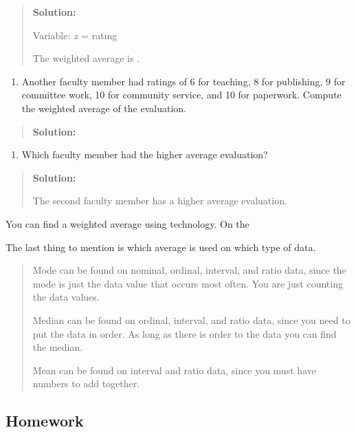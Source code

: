 \documentclass[]{book}
\providecommand{\tightlist}{%
  \setlength{\itemsep}{0pt}\setlength{\parskip}{0pt}}
\begin{document}
\begin{quote}
\textbf{Solution:}

Variable: \emph{x} = rating

The weighted average is .
\end{quote}

\begin{enumerate}
\def\labelenumi{\alph{enumi})}
\setcounter{enumi}{1}
\tightlist
\item
  Another faculty member had ratings of 6 for teaching, 8 for
  publishing, 9 for committee work, 10 for community service, and 10
  for paperwork. Compute the weighted average of the evaluation.
\end{enumerate}

\begin{quote}
\textbf{Solution:}
\end{quote}

\begin{enumerate}
\def\labelenumi{\alph{enumi})}
\setcounter{enumi}{2}
\tightlist
\item
  Which faculty member had the higher average evaluation?
\end{enumerate}

\begin{quote}
\textbf{Solution:}

The second faculty member has a higher average evaluation.
\end{quote}

You can find a weighted average using technology. On the

The last thing to mention is which average is used on which type of
data.

\begin{quote}
Mode can be found on nominal, ordinal, interval, and ratio data, since
the mode is just the data value that occurs most often. You are just
counting the data values.

Median can be found on ordinal, interval, and ratio data, since you
need to put the data in order. As long as there is order to the data
you can find the median.

Mean can be found on interval and ratio data, since you must have
numbers to add together.
\end{quote}

\hypertarget{homework-7}{%
\subsection{Homework}\label{homework-7}}
\end{document}
